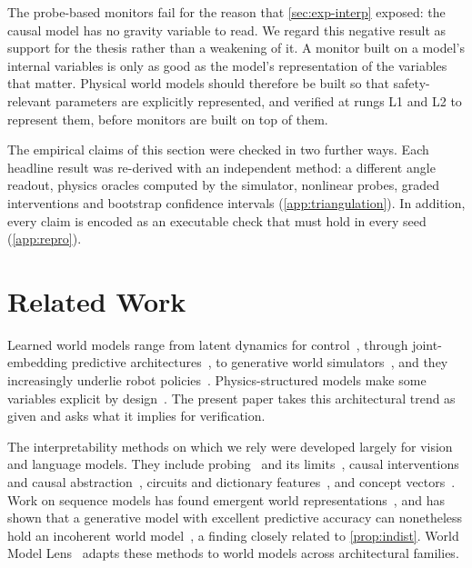 \documentclass[11pt]{article}
\theoremstyle{definition}\newtheorem{definition}{Definition}
\begin{document}
The probe-based monitors fail for the reason that \cref{sec:exp-interp} exposed: the causal model has no gravity variable to read. We regard this negative result as support for the thesis rather than a weakening of it. A monitor built on a model's internal variables is only as good as the model's representation of the variables that matter. Physical world models should therefore be built so that safety-relevant parameters are explicitly represented, and verified at rungs L1 and L2 to represent them, before monitors are built on top of them.

The empirical claims of this section were checked in two further ways. Each headline result was re-derived with an independent method: a different angle readout, physics oracles computed by the simulator, nonlinear probes, graded interventions and bootstrap confidence intervals (\cref{app:triangulation}). In addition, every claim is encoded as an executable check that must hold in every seed (\cref{app:repro}).

\section{Related Work}\label{sec:related}
Learned world models range from latent dynamics for control~\citep{ha2018world,hafner2023dreamerv3}, through joint-embedding predictive architectures~\citep{lecun2022path,assran2023ijepa,assran2025vjepa2}, to generative world simulators~\citep{bruce2024genie,nvidia2025cosmos}, and they increasingly underlie robot policies~\citep{brohan2023rt2,kim2024openvla,black2024pi0}. Physics-structured models make some variables explicit by design~\citep{greydanus2019hamiltonian}. The present paper takes this architectural trend as given and asks what it implies for verification.

The interpretability methods on which we rely were developed largely for vision and language models. They include probing~\citep{alain2016probes,belinkov2022probing} and its limits~\citep{elazar2021amnesic}, causal interventions and causal abstraction~\citep{geiger2021causal,meng2022rome,wang2023ioi}, circuits and dictionary features~\citep{olah2020zoom,elhage2022superposition,bricken2023monosemanticity,templeton2024scaling}, and concept vectors~\citep{kim2018tcav}. Work on sequence models has found emergent world representations~\citep{li2023othello,nanda2023emergent,gurnee2023space}, and has shown that a generative model with excellent predictive accuracy can nonetheless hold an incoherent world model~\citep{vafa2024evaluating}, a finding closely related to \cref{prop:indist}. World Model Lens~\citep{worldmodellens} adapts these methods to world models across architectural families.
\end{document}
